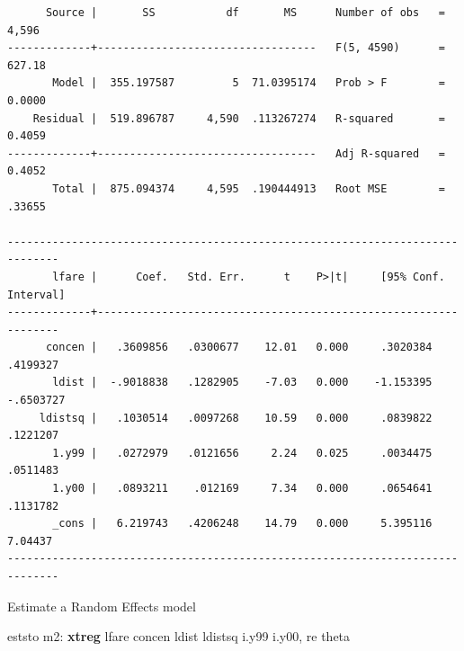 \documentclass[
]{book}
\newenvironment{Shaded}{\begin{snugshade}}{\end{snugshade}}
\newcommand{\KeywordTok}[1]{\textcolor[rgb]{0.13,0.29,0.53}{\textbf{#1}}}
\newcommand{\NormalTok}[1]{#1}
\begin{document}
\begin{verbatim}
      Source |       SS           df       MS      Number of obs   =     4,596
-------------+----------------------------------   F(5, 4590)      =    627.18
       Model |  355.197587         5  71.0395174   Prob > F        =    0.0000
    Residual |  519.896787     4,590  .113267274   R-squared       =    0.4059
-------------+----------------------------------   Adj R-squared   =    0.4052
       Total |  875.094374     4,595  .190444913   Root MSE        =    .33655

------------------------------------------------------------------------------
       lfare |      Coef.   Std. Err.      t    P>|t|     [95% Conf. Interval]
-------------+----------------------------------------------------------------
      concen |   .3609856   .0300677    12.01   0.000     .3020384    .4199327
       ldist |  -.9018838   .1282905    -7.03   0.000    -1.153395   -.6503727
     ldistsq |   .1030514   .0097268    10.59   0.000     .0839822    .1221207
       1.y99 |   .0272979   .0121656     2.24   0.025     .0034475    .0511483
       1.y00 |   .0893211    .012169     7.34   0.000     .0654641    .1131782
       _cons |   6.219743   .4206248    14.79   0.000     5.395116     7.04437
------------------------------------------------------------------------------
\end{verbatim}

Estimate a Random Effects model

\begin{Shaded}
\begin{Highlighting}[]
\NormalTok{eststo m2: }\KeywordTok{xtreg}\NormalTok{ lfare concen ldist ldistsq i.y99 i.y00, re theta}
\end{Highlighting}
\end{Shaded}
\end{document}
